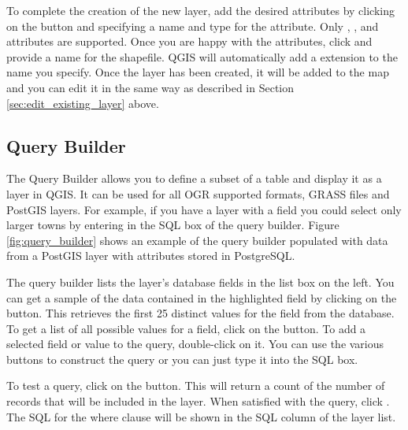 To complete the creation of the new layer, add the desired attributes by
clicking on the  button and specifying a name and type for the
attribute. Only , , and  attributes are supported. Once you
are happy with the attributes, click  and provide a name for the shapefile.
QGIS will automatically add a  extension to the name you specify.  Once
the layer has been created, it will be added to the map and you can edit it in
the same way as described in Section \ref{sec:edit_existing_layer} above. 

\subsection{Query Builder}\label{sec:query_builder}

The Query Builder allows you to define a subset of a table and display
it as a layer in QGIS. It can be used for all OGR supported formats, GRASS 
files and PostGIS layers. For example, if you have a  layer with a
 field you could select only larger towns by entering
 in the SQL box of the query builder. Figure
\ref{fig:query_builder} shows an example of the query builder populated with
data from a PostGIS layer with attributes stored in PostgreSQL. 


The query builder lists the layer's database
fields in the list box on the left. You can get a sample of the data
contained in the highlighted field by clicking on the  button. This retrieves the first 25 distinct values
for the field from the database. To get a list of all possible values for a
field, click on the  button. To add a selected field or value to the query, double-click on
it. You can use the various buttons to
construct the query or you can just type it into the SQL box.

To test a query, click on the  button. This will return a count of the number of records that will be
included in the layer. When satisfied with the query, click . The
SQL for the where clause will be shown in the SQL column of the layer list.

